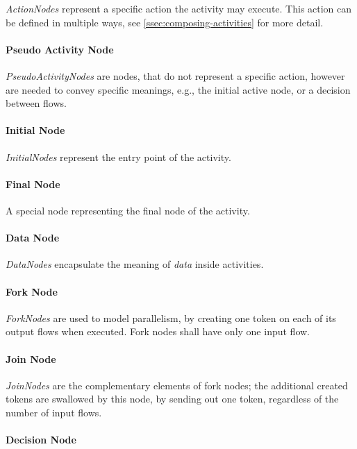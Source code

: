 \emph{ActionNodes} represent a specific action the activity may execute. This action can be defined in multiple ways, see \autoref{ssec:composing-activities} for more detail.

\paragraph{Pseudo Activity Node}

\emph{PseudoActivityNodes} are nodes, that do not represent a specific action, however are needed to convey specific meanings, e.g., the initial active node, or a decision between flows.

\paragraph{Initial Node}

\emph{InitialNodes} represent the entry point of the activity.

\paragraph{Final Node}

A special node representing the final node of the activity.

\paragraph{Data Node}

\emph{DataNodes} encapsulate the meaning of \emph{data} inside activities.

\paragraph{Fork Node}

\emph{ForkNodes} are used to model parallelism, by creating one token on each of its output flows when executed. Fork nodes shall have only one input flow.

\paragraph{Join Node}

\emph{JoinNodes} are the complementary elements of fork nodes; the additional created tokens are swallowed by this node, by sending out one token, regardless of the number of input flows.

\paragraph{Decision Node}

